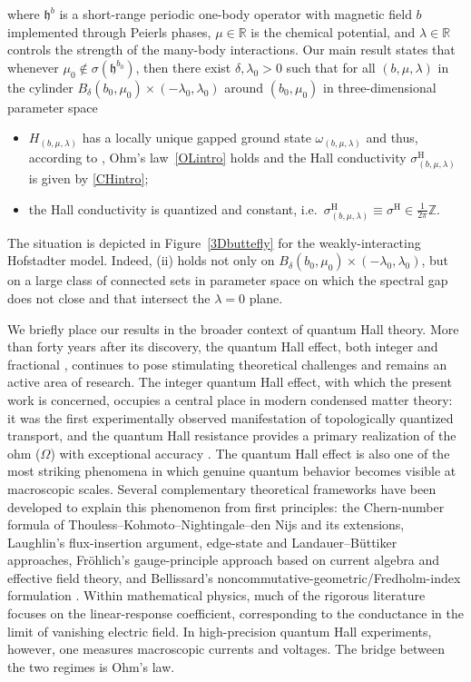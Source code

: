 \documentclass[a4paper]{article}
\newcommand{\w}{\omega}
\newcommand{\Z}{\mathbb{Z}}
\newcommand{\R}{\mathbb{R}}
\theoremstyle{plain}
\theoremstyle{definition}
\theoremstyle{remark}
\renewcommand{\(}{\left(}
\renewcommand{\)}{\right)}
\begin{document}
where $\mathfrak{h}^b$ is a short-range periodic one-body operator with magnetic field $b$ implemented through Peierls phases, $\mu\in\R$ is the chemical potential, and $\lambda\in\R$ controls the strength of the many-body interactions. Our main result   states that whenever $\mu_0 \notin\sigma(\mathfrak{h}^{b_0})$, then there exist $\delta, \lambda_0>0$ such that for all $(b,\mu,\lambda)$ in  the cylinder   $B_\delta(b_0,\mu_0)\times (-\lambda_0,\lambda_0)$
around $(b_0,\mu_0)$ in three-dimensional parameter space
\begin{itemize}
    \item[(i)] $H_{(b,\mu,\lambda)}$ has a locally unique gapped ground state $\w_{(b,\mu,\lambda)}$ and thus, according to \cite{WMMMT24},   Ohm's law~\eqref{OLintro} holds and the Hall conductivity $\sigma^\mathrm{H}_{(b,\mu,\lambda)}$ is given by \eqref{CHintro};
    \item[(ii)]
    the Hall conductivity is quantized and constant, i.e.\ $\sigma^\mathrm{H}_{(b,\mu,\lambda)}\equiv \sigma^\mathrm{H} \in \frac{1}{2\pi}\Z$.
\end{itemize}
The situation is depicted in Figure~\ref{3Dbuttefly} for the weakly-interacting Hofstadter model. Indeed, (ii) holds not only on $B_\delta(b_0,\mu_0)\times (-\lambda_0,\lambda_0)$, but  on a large class of connected sets in parameter space on which the spectral gap does not close and that intersect the $\lambda=0$ plane.


We briefly place our results in the broader context of quantum Hall theory. 
More than forty years after its discovery, the quantum Hall effect, both integer \cite{vonKlitzing1986quantized} and fractional \cite{stormer1999fractional}, continues to pose stimulating theoretical challenges and remains an active area of research. The integer quantum Hall effect, with which the present work is concerned, occupies a central place in modern condensed matter theory: it was the first experimentally observed manifestation of topologically quantized transport, and 
the quantum Hall resistance provides a primary realization of the ohm ($\Omega$)  with exceptional accuracy \cite{klitzing1980new, he2022accurate}.
The quantum Hall effect is also one of the most striking phenomena in which genuine quantum behavior becomes visible  at macroscopic scales. 
Several complementary theoretical frameworks have been developed to explain this phenomenon from first principles: the Chern-number formula of Thouless--Kohmoto--Nightingale--den Nijs and its extensions, Laughlin's flux-insertion argument, edge-state and Landauer--B\"uttiker approaches, Fr{\"o}hlich's gauge-principle approach based on current algebra and  effective field theory, and Bellissard's noncommutative-geometric/Fredholm-index formulation
\cite{TKNN,avron1983homotopy,niu1985quantized,halperin1982quantized,laughlin1981quantized,avron1985quantization,buttiker1988absence,frohlich1993gauge,bellissard1994noncommutative}.
Within mathematical physics, much of the rigorous literature focuses on the linear-response coefficient, corresponding to the conductance in the limit of vanishing electric field. In high-precision quantum Hall experiments, however, one measures macroscopic currents and voltages. The bridge between the two regimes is Ohm's law. 
\end{document}
